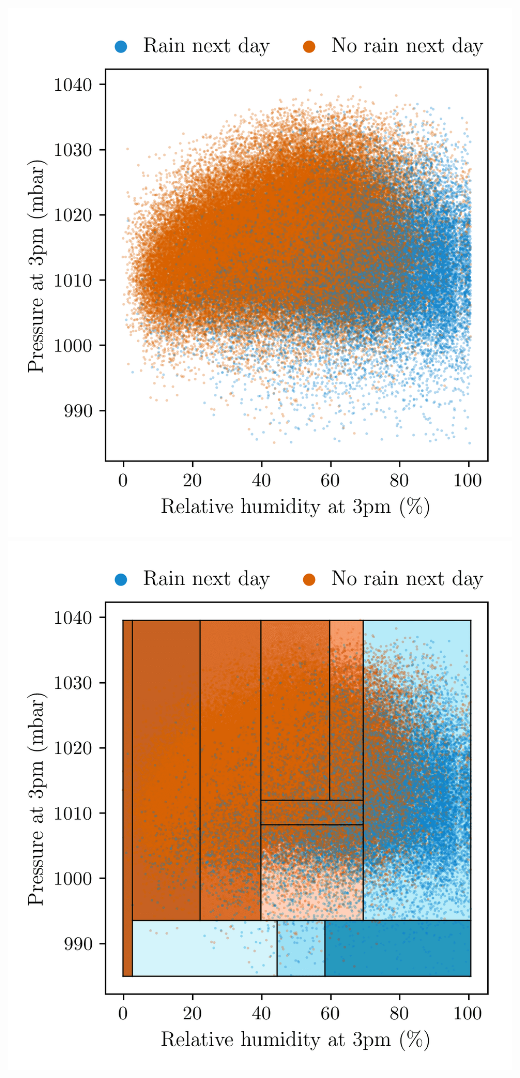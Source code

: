 \documentclass{article}
\begin{document}
\includegraphics[scale=0.5]{graphics/weather_data.png}
\includegraphics[scale=0.5]{graphics/weather_data_filled_partition.png}
\end{document}
